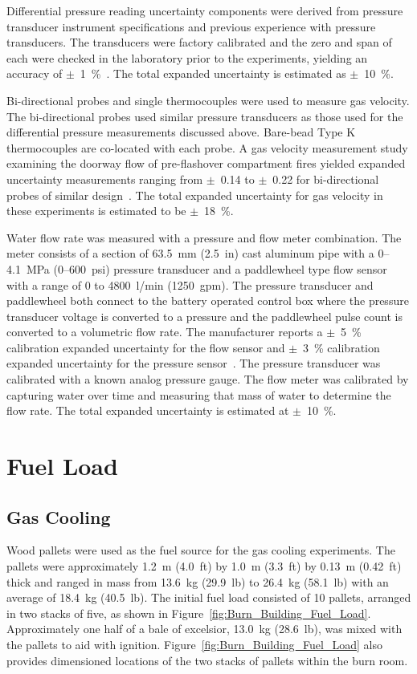 \documentclass[12pt,oneside]{book}
\begin{document}
Differential pressure reading uncertainty components were derived from pressure transducer instrument specifications and previous experience with pressure transducers. The transducers were factory calibrated and the zero and span of each were checked in the laboratory prior to the experiments, yielding an accuracy of $\pm$~1~\%~\cite{Setra:2002}. The total expanded uncertainty is estimated as $\pm$~10~\%.

Bi-directional probes and single thermocouples were used to measure gas velocity. The bi-directional probes used similar pressure transducers as those used for the differential pressure measurements discussed above. Bare-bead Type K thermocouples are co-located with each probe. A gas velocity measurement study examining the doorway flow of pre-flashover compartment fires yielded expanded uncertainty measurements ranging from $\pm$~0.14 to $\pm$~0.22 for bi-directional probes of similar design~\cite{Bryant:FSJ2009}. The total expanded uncertainty for gas velocity in these experiments is estimated to be $\pm$~18~\%.

Water flow rate was measured with a pressure and flow meter combination. The meter consists of a section of 63.5~mm (2.5~in) cast aluminum pipe with a 0--4.1~MPa (0--600~psi) pressure transducer and a paddlewheel type flow sensor with a range of 0 to 4800~l/min (1250~gpm). The pressure transducer and paddlewheel both connect to the battery operated control box where the pressure transducer voltage is converted to a pressure and the paddlewheel pulse count is converted to a volumetric flow rate.  The manufacturer reports a $\pm$~5~\% calibration expanded uncertainty for the flow sensor and $\pm$~3~\% calibration expanded uncertainty for the pressure sensor~\cite{Akron:2009}. The pressure transducer was calibrated with a known analog pressure gauge. The flow meter was calibrated by capturing water over time and measuring that mass of water to determine the flow rate. The total expanded uncertainty is estimated at $\pm$~10~\%.

\section{Fuel Load}
\label{sec:fuel_load}

\subsection{Gas Cooling}
\label{sec:Fuel_Load_Gas_Cooling}

Wood pallets were used as the fuel source for the gas cooling experiments. The pallets were approximately 1.2~m (4.0~ft) by 1.0~m (3.3~ft) by 0.13~m (0.42~ft) thick and ranged in mass from 13.6~kg (29.9~lb) to 26.4~kg (58.1~lb) with an average of 18.4~kg (40.5~lb). The initial fuel load consisted of 10 pallets, arranged in two stacks of five, as shown in Figure~\ref{fig:Burn_Building_Fuel_Load}. Approximately one half of a bale of excelsior, 13.0~kg (28.6~lb), was mixed with the pallets to aid with ignition. Figure~\ref{fig:Burn_Building_Fuel_Load} also provides dimensioned locations of the two stacks of pallets within the burn room.
\end{document}
